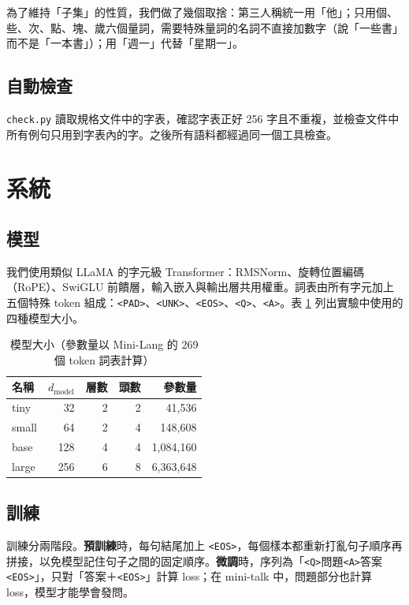 \documentclass[11pt,a4paper]{article}
\newcommand{\tok}[1]{\allowbreak\texttt{<#1>}}
\begin{document}
為了維持「子集」的性質，我們做了幾個取捨：第三人稱統一用「他」；只用個、些、次、點、塊、歲六個量詞，需要特殊量詞的名詞不直接加數字（說「一些書」而不是「一本書」）；用「週一」代替「星期一」。

\subsection{自動檢查}

\texttt{check.py} 讀取規格文件中的字表，確認字表正好 256 字且不重複，並檢查文件中所有例句只用到字表內的字。之後所有語料都經過同一個工具檢查。

\section{系統}\label{sec:system}

\subsection{模型}

我們使用類似 LLaMA 的字元級 Transformer：RMSNorm、旋轉位置編碼（RoPE）、SwiGLU 前饋層，輸入嵌入與輸出層共用權重。詞表由所有字元加上五個特殊 token 組成：\tok{PAD}、\tok{UNK}、\tok{EOS}、\tok{Q}、\tok{A}。表 \ref{tab:models} 列出實驗中使用的四種模型大小。

\begin{table}[H]
\centering
\caption{模型大小（參數量以 Mini-Lang 的 269 個 token 詞表計算）}\label{tab:models}
\begin{tabular}{lrrrr}
\toprule
名稱 & $d_{\text{model}}$ & 層數 & 頭數 & 參數量 \\
\midrule
tiny & 32 & 2 & 2 & 41,536 \\
small & 64 & 2 & 4 & 148,608 \\
base & 128 & 4 & 4 & 1,084,160 \\
large & 256 & 6 & 8 & 6,363,648 \\
\bottomrule
\end{tabular}
\end{table}

\subsection{訓練}

訓練分兩階段。\textbf{預訓練}時，每句結尾加上 \tok{EOS}，每個樣本都重新打亂句子順序再拼接，以免模型記住句子之間的固定順序。\textbf{微調}時，序列為「\tok{Q}問題\tok{A}答案\tok{EOS}」，只對「答案＋\tok{EOS}」計算 loss；在 mini-talk 中，問題部分也計算 loss，模型才能學會發問。
\end{document}
